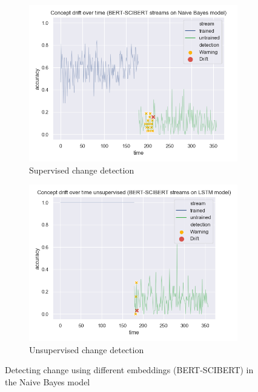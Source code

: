 \documentclass[12pt]{extreport}
\begin{document}
\begin{figure}[H]
\centering
\begin{subfigure}{.5\textwidth}
  \centering
  \includegraphics[width=\linewidth]{assets/detecting-change/diff_embed_nb_wos_1_BERT_SCIBERT.png}
  \caption{Supervised change detection}
  \label{fig:nb-diff-embed-super-B-S}
\end{subfigure}%
\begin{subfigure}{.5\textwidth}
  \centering
  \includegraphics[width=\linewidth]{assets/detecting-change/diff_embed_nb_wos_1_BERT_SCIBERT_unsupervised.png}
  \caption{Unsupervised change detection}
  \label{fig:nb-diff-embed-unsuper-B-S}
\end{subfigure}
\caption{Detecting change using different embeddings (BERT-SCIBERT) in the Naive Bayes model}
\label{fig:nb-diff-embed-B-S}
\end{figure}
\end{document}

